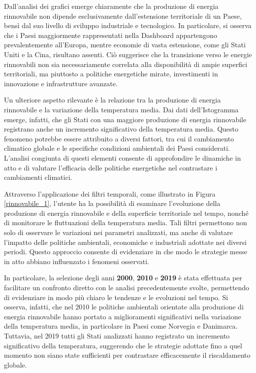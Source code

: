 Dall'analisi dei grafici emerge chiaramente che la produzione di energia rinnovabile non dipende esclusivamente dall'estensione territoriale di un Paese, bensì dal suo livello di sviluppo industriale e tecnologico. In particolare, si osserva che i Paesi maggiormente rappresentati nella Dashboard appartengono prevalentemente all'Europa, mentre economie di vasta estensione, come gli Stati Uniti e la Cina, risultano assenti. Ciò suggerisce che la transizione verso le energie rinnovabili non sia necessariamente correlata alla disponibilità di ampie superfici territoriali, ma piuttosto a politiche energetiche mirate, investimenti in innovazione e infrastrutture avanzate.  

Un ulteriore aspetto rilevante è la relazione tra la produzione di energia rinnovabile e la variazione della temperatura media. Dai dati dell'Istogramma emerge, infatti, che gli Stati con una maggiore produzione di energia rinnovabile registrano anche un incremento significativo della temperatura media. Questo fenomeno potrebbe essere attribuito a diversi fattori, tra cui il cambiamento climatico globale e le specifiche condizioni ambientali dei Paesi considerati. L'analisi congiunta di questi elementi consente di approfondire le dinamiche in atto e di valutare l'efficacia delle politiche energetiche nel contrastare i cambiamenti climatici.  

Attraverso l'applicazione dei filtri temporali, come illustrato in Figura \ref{rinnovabile_1}, l'utente ha la possibilità di esaminare l'evoluzione della produzione di energia rinnovabile e della superficie territoriale nel tempo, nonché di monitorare le fluttuazioni della temperatura media. Tali filtri permettono non solo di osservare le variazioni nei parametri analizzati, ma anche di valutare l'impatto delle politiche ambientali, economiche e industriali adottate nei diversi periodi. Questo approccio consente di evidenziare in che modo le strategie messe in atto abbiano influenzato i fenomeni osservati.  

In particolare, la selezione degli anni \textbf{2000}, \textbf{2010} e \textbf{2019} è stata effettuata per facilitare un confronto diretto con le analisi precedentemente svolte, permettendo di evidenziare in modo più chiaro le tendenze e le evoluzioni nel tempo. Si osserva, infatti, che nel 2010 le politiche ambientali orientate alla produzione di energia rinnovabile hanno portato a miglioramenti significativi nella variazione della temperatura media, in particolare in Paesi come Norvegia e Danimarca. Tuttavia, nel 2019 tutti gli Stati analizzati hanno registrato un incremento significativo della temperatura, suggerendo che le strategie adottate fino a quel momento non siano state sufficienti per contrastare efficacemente il riscaldamento globale.

